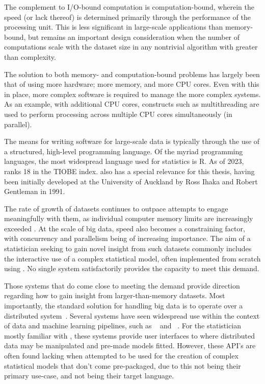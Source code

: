 The complement to I/O-bound computation is computation-bound, wherein the speed (or lack thereof) is determined primarily through the performance of the processing unit.
This is less significant in large-scale applications than memory-bound, but remains an important design consideration when the number of computations scale with the dataset size in any nontrivial algorithm with greater than  complexity.

The solution to both memory- and computation-bound problems has largely been that of using more hardware; more memory, and more CPU cores.
Even with this in place, more complex software is required to manage the more complex systems.
As an example, with additional CPU cores, constructs such as multithreading are used to perform processing across multiple CPU cores simultaneously (in parallel).

The means for writing software for large-scale data is typically through the use of a structured, high-level programming language.
Of the myriad programming languages, the most widespread language used for statistics is R.
As of 2023, \R{} ranks {18} in the TIOBE index.
\R{} also has a special relevance for this thesis, having been
initially developed at the University of Auckland by Ross Ihaka and
Robert Gentleman in 1991\cite{ihaka1996r}.

The rate of growth of datasets continues to outpace attempts to engage meaningfully with them, as individual computer memory limits are increasingly exceeded \cite{kleppmann2017dataintensive}.
At the scale of big data, speed also becomes a constraining factor, with concurrency and parallelism being of increasing importance.
The aim of a statistician seeking to gain novel insight from such datasets commonly includes the interactive use of a complex statistical model, often implemented from scratch using \R{}.
No single system satisfactorily provides the capacity to meet this demand.

Those systems that do come close to meeting the demand provide direction regarding how to gain insight from larger-than-memory datasets.
Most importantly, the standard solution for handling big data is to operate over a distributed system~\cite{boja2012distributed}.
Several systems have seen widespread use within the context of data and machine learning pipelines, such as ~\cite{zaharia2016apache} and ~\cite{shvachko2010hadoop}.
For the statistician mostly familiar with \R{}, these systems provide user interfaces to \R{} where distributed data may be manipulated and pre-made models fitted.
However, these API's are often found lacking when attempted to be used for the creation of complex statistical models that don't come pre-packaged, due to this not being their primary use-case, and \R{} not being their target language.

